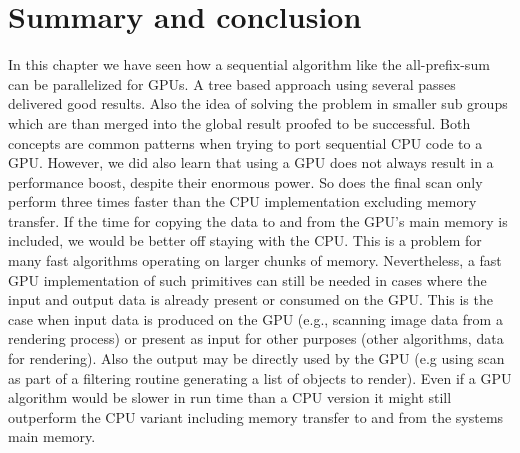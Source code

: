 \section{Summary and conclusion}
In this chapter we have seen how a sequential algorithm like the all-prefix-sum can be parallelized for GPUs. A tree based approach using several passes delivered good results. Also the idea of solving the problem in smaller sub groups which are than merged into the global result proofed to be successful. Both concepts are common patterns when trying to port sequential CPU code to a GPU. However, we did also learn that using a GPU does not always result in a performance boost, despite their enormous power. So does the final scan only perform three times faster than the CPU implementation excluding memory transfer. If the time for copying the data to and from the GPU's main memory is included, we would be better off staying with the CPU. This is a problem for many fast algorithms operating on larger chunks of memory. Nevertheless, a fast GPU implementation of such primitives can still be needed in cases where the input and output data is already present or consumed on the GPU. This is the case when input data is produced on the GPU (e.g., scanning image data from a rendering process) or present as input for other purposes (other algorithms, data for rendering). Also the output may be directly used by the GPU (e.g using scan as part of a filtering routine generating a list of objects to render). Even if a GPU algorithm would be slower in run time than a CPU version it might still outperform the CPU variant including memory transfer to and from the systems main memory.
